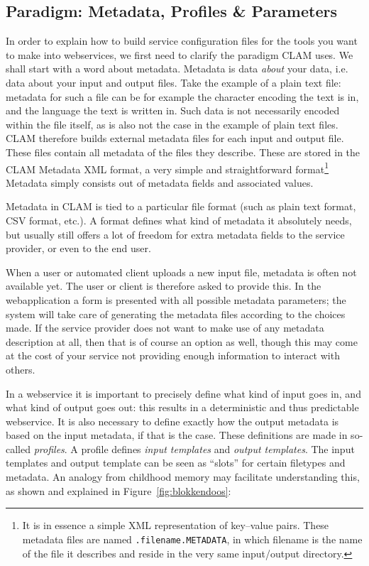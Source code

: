 \documentclass[a4paper,12pt]{report}
\begin{document}
\subsection{Paradigm: Metadata, Profiles \& Parameters}

In order to explain how to build service configuration files for the tools you want to make into webservices, we first need to clarify the paradigm CLAM uses. We shall start with a word about metadata. Metadata is data \emph{about}\/ your data, i.e. data about your input and output files. Take the example of a plain text file: metadata for such a file can be for example the character encoding the text is in, and the language the text is written in. Such data is not necessarily encoded within the file itself, as is also not the case in the example of plain text files. CLAM therefore builds external metadata files for each input and output file. These files contain all metadata of the files they describe. These are stored in the CLAM Metadata XML format, a very simple and straightforward format\footnote{It is in essence a simple XML representation of key--value pairs. These metadata files are named \texttt{.filename.METADATA}, in which filename is the name of the file it describes and reside in the very same input/output directory.} Metadata simply consists out of metadata fields and associated values.

Metadata in CLAM is tied to a particular file format (such as plain text format, CSV format, etc.). A format defines what kind of metadata it absolutely needs, but usually still offers a lot of freedom for extra metadata fields to the service provider, or even to the end user. 

When a user or automated client uploads a new input file, metadata is often not available yet. The user or client is therefore asked to provide this. In the webapplication a form is presented with all possible metadata parameters; the system will take care of generating the metadata files according to the choices made. If the service provider does not want to make use of any metadata description at all, then that is of course an option as well, though this may come at the cost of your service not providing enough information to interact with others.

In a webservice it is important to precisely define what kind of input goes in, and what kind of output goes out: this results in a deterministic and thus predictable webservice. It is also necessary to define exactly how the output metadata is based on the input metadata, if that is the case. These definitions are made in so-called \emph{profiles}. A profile defines \emph{input templates} and \emph{output templates}. The input templates and output template can be seen as ``slots'' for certain filetypes and metadata. An analogy from childhood memory may facilitate understanding this, as shown and explained in Figure~\ref{fig:blokkendoos}:
\end{document}
